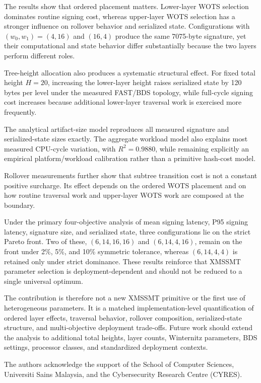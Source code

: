 \documentclass[pdflatex,sn-mathphys-num]{sn-jnl}
\begin{document}
The results show that ordered placement matters. Lower-layer WOTS
selection dominates routine signing cost, whereas upper-layer WOTS
selection has a stronger influence on rollover behavior and serialized
state. Configurations with $(w_0,w_1)=(4,16)$ and $(16,4)$ produce the
same 7075-byte signature, yet their computational and state behavior
differ substantially because the two layers perform different roles.

Tree-height allocation also produces a systematic structural effect.
For fixed total height $H=20$, increasing the lower-layer height raises
serialized state by 120 bytes per level under the measured FAST/BDS
topology, while full-cycle signing cost increases because additional
lower-layer traversal work is exercised more frequently.

The analytical artifact-size model reproduces all measured signature
and serialized-state sizes exactly. The aggregate workload model also
explains most measured CPU-cycle variation, with $R^2=0.9880$, while
remaining explicitly an empirical platform/workload calibration rather
than a primitive hash-cost model.

Rollover measurements further show that subtree transition cost is not
a constant positive surcharge. Its effect depends on the ordered WOTS
placement and on how routine traversal work and upper-layer WOTS work
are composed at the boundary.

Under the primary four-objective analysis of mean signing latency,
P95 signing latency, signature size, and serialized state, three
configurations lie on the strict Pareto front. Two of these,
$(6,14,16,16)$ and $(6,14,4,16)$, remain on the front under 2\%, 5\%,
and 10\% symmetric tolerance, whereas $(6,14,4,4)$ is retained only
under strict dominance. These results reinforce that XMSSMT parameter
selection is deployment-dependent and should not be reduced to a single
universal optimum.

The contribution is therefore not a new XMSSMT primitive or the first
use of heterogeneous parameters. It is a matched implementation-level
quantification of ordered layer effects, traversal behavior, rollover
composition, serialized-state structure, and multi-objective deployment
trade-offs. Future work should extend the analysis to additional total
heights, layer counts, Winternitz parameters, BDS settings, processor
classes, and standardized deployment contexts.

The authors acknowledge the support of the School of Computer Sciences, Universiti Sains Malaysia, and the Cybersecurity Research Centre (CYRES).
\end{document}
